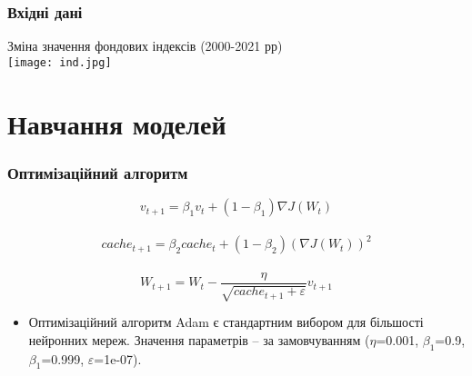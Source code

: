 \documentclass[aspectratio=169]{beamer}
\begin{document}
	\begin{frame}
		\frametitle{Вхідні дані}
		\begin{center}
			Зміна значення фондових індексів (2000-2021 рр) \\
			\bigskip
			\texttt{[image: ind.jpg]}
		\end{center}
	\end{frame}
	
	\section{Навчання моделей}
	
	\begin{frame}
		\frametitle{Оптимізаційний алгоритм}
		\[ v_{t+1} = \beta_{1} v_{t} + (1-\beta_{1})\nabla J(W_{t}) \]\\
		\[ cache_{t+1} = \beta_{2} cache_{t} + (1-\beta_{2})(\nabla J(W_{t}))^{2} \]\\
		\[ W_{t+1} = W_{t}-\frac{\eta}{\sqrt{cache_{t+1}+\varepsilon}}v_{t+1} \]
		\bigskip
		\begin{itemize}
			\item \alert {Оптимізаційний алгоритм Adam} є стандартним вибором для більшості нейронних мереж. Значення параметрів – за замовчуванням ($\eta$=0.001, $\beta_{1}$=0.9, $\beta_{1}$=0.999, $\varepsilon$=1e-07). 
		\end{itemize}
	\end{frame}
	
\end{document}

